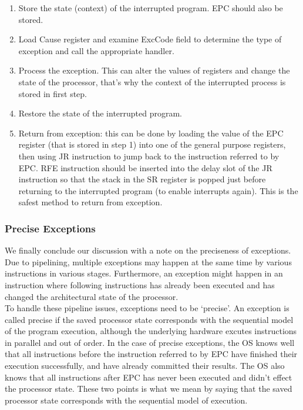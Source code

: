 \documentclass[oneside]{book}
\begin{document}
\begin{enumerate}

\item Store the state (context) of the interrupted program. EPC
      should also be stored.

\item Load Cause register and examine ExcCode field to determine
      the type of exception and call the appropriate handler.

\item Process the exception. This can alter the values of
      registers and change the state of the processor, that's
      why the context of the interrupted process is stored in first
      step.

\item Restore the state of the interrupted program.

\item Return from exception: this can be done by loading the value
      of the EPC register (that is stored in step 1) into one of
      the general purpose registers, then using JR instruction to
      jump back to the instruction referred to by EPC. RFE instruction
      should be inserted into the delay slot of the JR instruction
      so that the stack in the SR register is popped just before
      returning to the interrupted program (to enable interrupts
      again). This is the safest method to return from exception.

\end{enumerate}

\subsubsection{Precise Exceptions}

We finally conclude our discussion with a note on the preciseness
of exceptions. Due to pipelining, multiple exceptions may
happen at the same time by various instructions in various
stages. Furthermore, an exception might happen in an instruction
where following instructions has already been executed and has
changed the architectural state of the processor.\\

To handle these pipeline issues, exceptions need to be `precise'.
An exception is called precise if the saved processor state
corresponds with the sequential model of the program execution,
although the underlying hardware excutes instructions in parallel
and out of order. In the case of precise exceptions, the OS
knows well that all instructions before the instruction referred
to by EPC have finished their execution successfully, and have
already committed their results. The OS also knows that
all instructions after EPC has never been executed and didn't
effect the processor state. These two points is what we mean
by saying that the saved processor state corresponds with
the sequential model of execution.\\
\end{document}

